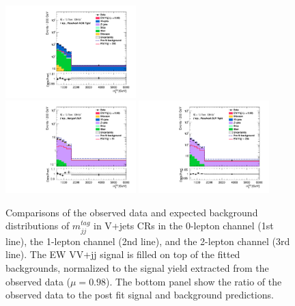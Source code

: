 \begin{figure}[]
    \includegraphics[width=0.45\textwidth]{figures/PostFit/Region_disttagMjj_DCRVjetTight_BMin0_T0_Y6051_incTag1_J2_L1_incJet1_GlobalFit_unconditionnal_mu1log}
    \\
     \includegraphics[width=0.45\textwidth]{figures/PostFit/Region_distMTagMerJets_DCRVjet_BMin0_J0_incJet1_L2_T0_incFat1_Y6051_incTag1_Fat1_GlobalFit_unconditionnal_mu1log}
      \includegraphics[width=0.45\textwidth]{figures/PostFit/Region_distMTagResJets_DCRVjetFid_BMin0_T0_Y6051_incTag1_J2_L2_incJet1_GlobalFit_unconditionnal_mu1log}
    \caption{Comparisons of the observed data and expected background distributions of $m^{tag}_{jj}$ in V+jets CRs in the 0-lepton channel (1st line), the 1-lepton channel (2nd line), and the 2-lepton channel (3rd line). The EW VV+jj signal is filled on top of the fitted backgrounds, normalized to the signal yield extracted from the observed data ($\mu = 0.98$). The bottom panel show the ratio of the observed data to the post fit signal and background predictions.}
    \label{fig:postCR}
\end{figure}

